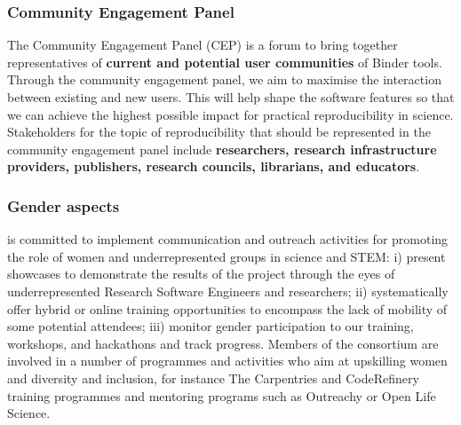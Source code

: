 \subsubsection{Community Engagement Panel}\label{sec:community-engagement-panel}
The Community Engagement Panel (CEP) is a forum to bring together
representatives of \textbf{current and potential user communities} of Binder tools.
Through the community engagement panel, we aim to maximise the interaction between existing and new users.
This will help shape the software features so that we can
achieve the highest possible impact for practical reproducibility in science.
Stakeholders for the topic of reproducibility that should be represented in the
community engagement panel include \textbf{researchers, research infrastructure
providers, publishers, research councils, librarians, and educators}.



\subsubsection{Gender aspects}\label{sec:gender}





\TheProject is committed to implement communication and outreach activities for
promoting the role of women and underrepresented groups in science
and STEM: i) present showcases to demonstrate the results of the project through
the eyes of underrepresented Research Software Engineers and researchers; ii)
systematically offer hybrid or online training opportunities to encompass the
lack of mobility of some potential attendees; iii) monitor gender participation
to our training, workshops, and hackathons and track progress. Members of the
consortium are involved in a number of programmes and activities who aim at
upskilling women and diversity and inclusion, for instance The Carpentries and
CodeRefinery training programmes and mentoring programs such as Outreachy or
Open Life Science.

